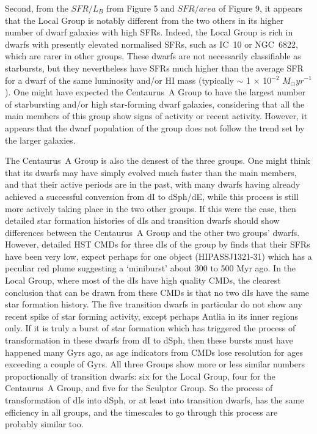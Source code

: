 \documentclass[preprint]{aastex}
\begin{document}
Second, from the $SFR/L_B$ from Figure 5 and $SFR/{area}$ of Figure 9, 
it appears that the Local Group is notably different from
the two others in its higher number of dwarf galaxies with high SFRs.
Indeed, the Local Group is rich in dwarfs with presently elevated normalised SFRs, 
such as IC~10 or NGC~6822, which are rarer in other groups. These dwarfs are 
not necessarily classifiable as starbursts, but they nevertheless have SFRs 
much higher than the average 
SFR for a dwarf of the same luminosity and/or HI mass (typically 
$\sim$ 1 $\times$ 10$^{-2}$ $M_{\odot} yr^{-1}$).
One might have expected the Centaurus~A Group to have the largest number of
starbursting and/or high star-forming dwarf galaxies, considering that all the
main members of this group show signs of activity or recent activity. However, 
it appears
that the dwarf population of the group does not follow the trend set by the
larger galaxies. 

The Centaurus~A Group is also the densest of the three groups. One might think that 
its dwarfs may have simply evolved much faster
than the main members, and that their active periods are in the past, with
many dwarfs having already achieved a successful conversion from dI to dSph/dE,
while this process is still more actively taking place in the two other groups.
If this were the case, then detailed star formation histories of dIs and
transition dwarfs should show differences between the Centaurus~A Group and the other
two groups' dwarfs. However, detailed HST CMDs for three dIs of the group 
by \citet{g07} finds that their SFRs have been very low, expect perhaps for 
one object (HIPASSJ1321-31)
which has a peculiar red plume suggesting a `miniburst' about 300 to 500 Myr ago.
In the Local Group, where most of the dIs have high quality CMDs, the clearest 
conclusion
that can be drawn from these CMDs is that no two dIs have the same star formation
history. The five transition dwarfs in particular do not show any recent spike
of star forming activity, except perhaps Antlia in its inner regions only.
If it is truly a burst of star formation which has triggered the process of
transformation in these dwarfs from dI to dSph, then these bursts must have
happened many Gyrs ago, as age indicators from CMDs lose resolution for
ages exceeding a couple of Gyrs. All three Groups show more or less similar numbers
proportionally of transition dwarfs: six for the Local Group, four for the 
Centaurus~A Group, and five for the Sculptor Group.
So the process of transformation of dIs into dSph, or at least into transition 
dwarfs, has the same efficiency in all groups, and the 
timescales to go through this process are probably similar too.
\end{document}
